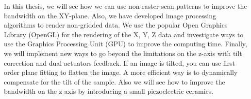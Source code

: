 In this thesis, we will see how we can use non-raster scan patterns to improve the bandwidth on the XY-plane. Also, we have developed image processing algorithms to render non-gridded data. We use the popular Open Graphics Library (OpenGL) for the rendering of the X, Y, Z data and investigate ways to use the Graphics Processing Unit (GPU) to improve the computing time.
Finally, we will implement new ways to go beyond the limitations on the z-axis with tilt correction and dual actuators feedback. If an image is tilted, you can use first-order plane fitting to flatten the image. A more efficient way is to dynamically compensate for the tilt of the sample. Also we will see how to improve the bandwidth on the z-axis by introducing a small piezoelectric ceramics.
